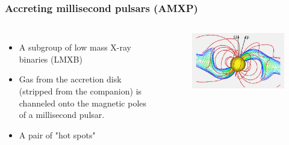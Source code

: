 \documentclass{beamer}
\begin{document}
\begin{frame}
\frametitle{Accreting millisecond pulsars (AMXP)}
\begin{columns}[c] %

\begin{itemize}
\item A subgroup of low mass X-ray binaries (LMXB)
\item Gas from the accretion disk (stripped from the companion) is channeled onto the magnetic poles of a millisecond pulsar.
\item A pair of "hot spots"
\end{itemize}


\begin{figure}
\includegraphics[width=1.1\linewidth]{schematic.jpg}
\end{figure}

\end{columns}
\end{frame}
\end{document}
